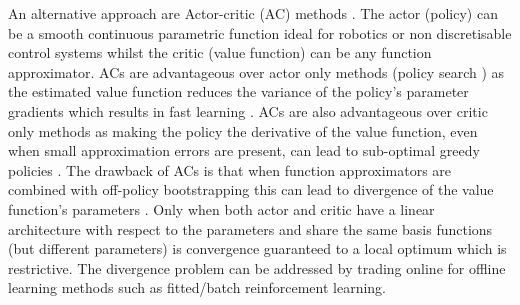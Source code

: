 \documentclass[final,5p,times,twocolumn]{elsarticle}
\begin{document}

An alternative approach are Actor-critic (AC) methods \cite[Chap. 6.6]{sutton1998reinforcement}. 
The actor (policy) can be a smooth continuous parametric function ideal for robotics or non discretisable control systems
whilst the critic (value function) can be any function approximator. ACs are advantageous over actor only methods 
(policy search \cite{p_search_surv_2011}) as the estimated value function reduces the variance of the policy's 
parameter gradients which results in fast learning \cite{rl_ac_surv_2012}. 
ACs are also advantageous over critic only methods as making the policy the derivative of 
the value function, even when small approximation errors are present, can lead to sub-optimal 
greedy policies \cite{Baxter_GPOMDP_2000}. The drawback of ACs is that 
when function approximators are combined with off-policy bootstrapping \cite[Chap. 8.5]{sutton1998reinforcement} this can lead 
to divergence of the value function's parameters \cite{Baird95}. Only when both actor and critic
have a linear architecture with respect to the parameters and share the same basis functions 
(but different parameters) is convergence guaranteed to a local optimum \cite{Sutton00policygradient} 
which is restrictive. The divergence problem can be addressed by trading online for 
offline learning methods such as fitted/batch reinforcement learning.
\end{document}
